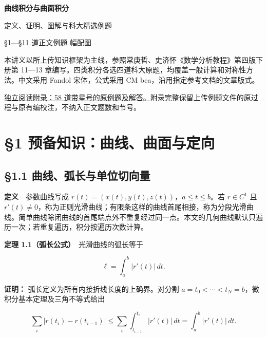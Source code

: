 \documentclass[11pt,a4paper]{article}
\begin{document}
\begin{center}{\LARGE\bfseries 曲线积分与曲面积分\par}\vspace{7pt}
{\large 定义、证明、图解与科大精选例题\par}\vspace{5pt}
{§1—§11 道正文例题 幅配图}\end{center}
本讲义以所上传知识框架为主线，参照常庚哲、史济怀《数学分析教程》第四版下册第 11—13 章编写。四类积分各选四道科大原题，均覆盖一般计算和对称性方法。中文采用 Fandol 宋体，公式采用 CM bea，沿用指定参考文档的文章版式。

\href{https://zj139.github.io/math-notes/files/notes/curve-surface-appendix-starred-cm-bea.pdf}{独立阅读附录：58 道带星号的原例题及解答。}附录完整保留上传例题文件的原过程与原有编校注，不纳入正文题数和节号。
\hypertarget{lecture-toc}{}\begingroup\setlength{\parskip}{0pt}\small\tableofcontents\endgroup\clearpage
{}
\section{§1
预备知识：曲线、曲面与定向}\label{ux9884ux5907ux77e5ux8bc6ux66f2ux7ebfux66f2ux9762ux4e0eux5b9aux5411}

\subsection{§1.1
曲线、弧长与单位切向量}\label{ux66f2ux7ebfux5f27ux957fux4e0eux5355ux4f4dux5207ux5411ux91cf}

\textbf{定义}　参数曲线写成
\(r(t)=(x(t),y(t),z(t))\)，\(a\le t\le b\)。若 \(r\in C^1\) 且
\(r'(t)\ne0\)，称为正则光滑曲线；有限条这样的曲线首尾相接，称为分段光滑曲线。简单曲线除闭曲线的首尾端点外不重复经过同一点。本文的几何曲线默认只遍历一次；若重复遍历，积分按遍历次数计算。

\textbf{定理 1.1（弧长公式）}　光滑曲线的弧长等于

\begin{equation*}
\ell=\int_a^b|r'(t)|\,dt.\tag{1.1}
\end{equation*}

\textbf{证明：} 弧长定义为所有内接折线长度的上确界。对分割
\(a=t_0<\cdots<t_N=b\)，微积分基本定理及三角不等式给出

\begin{equation*}
\sum_i|r(t_i)-r(t_{i-1})|
\le\sum_i\int_{t_{i-1}}^{t_i}|r'(t)|\,dt
=\int_a^b|r'(t)|\,dt.
\end{equation*}
\end{document}
